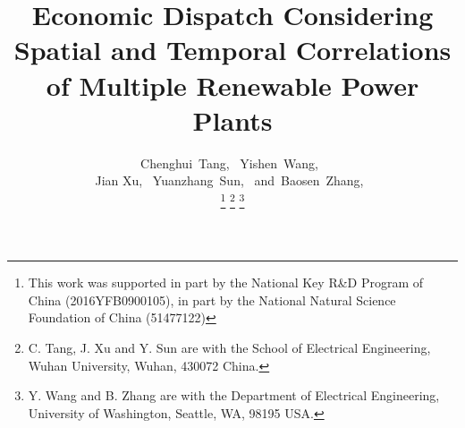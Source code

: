     \title{Economic Dispatch Considering Spatial and Temporal Correlations of Multiple Renewable Power Plants}
  \author{Chenghui~Tang,~
      Yishen~Wang,~ \\
      Jian Xu,~
      Yuanzhang~Sun,~
      and~Baosen~Zhang,~\\%

\thanks{This work was supported in part by the National Key R\&D Program of China (2016YFB0900105), in part by the National Natural Science Foundation of China (51477122)}
\thanks{
	C. Tang, J. Xu and Y. Sun are with the School of Electrical Engineering, Wuhan University, Wuhan, 430072 China.}
\thanks{
	Y. Wang and B. Zhang are with the Department of Electrical Engineering, University of Washington, Seattle, WA, 98195 USA.}}

\maketitle




%

